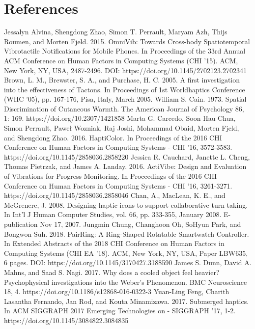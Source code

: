 \documentclass[preprint,12pt]{elsarticle}
\begin{document}
\section*{References}
\begin{thebibliography}{00}

Jessalyn Alvina, Shengdong Zhao, Simon T. Perrault, Maryam Azh, Thijs Roumen, and Morten Fjeld. 2015. OmniVib: Towards Cross-body Spatiotemporal Vibrotactile Notifications for Mobile Phones. In Proceedings of the 33rd Annual ACM Conference on Human Factors in Computing Systems (CHI '15). ACM, New York, NY, USA, 2487-2496. DOI: https://doi.org/10.1145/2702123.2702341
Brown, L. M., Brewster, S. A., and Purchase, H. C. 2005. A first investigation into the effectiveness of Tactons. In Proceedings of 1st Worldhaptics Conference (WHC '05), pp. 167-176, Pisa, Italy, March 2005.
William S. Cain. 1973. Spatial Discrimination of Cutaneous Warmth. The American Journal of Psychology 86, 1: 169. https://doi.org/10.2307/1421858
Marta G. Carcedo, Soon Hau Chua, Simon Perrault, Paweł Wozniak, Raj Joshi, Mohammad Obaid, Morten Fjeld, and Shengdong Zhao. 2016. HaptiColor. In Proceedings of the 2016 CHI Conference on Human Factors in Computing Systems - CHI '16, 3572-3583. https://doi.org/10.1145/2858036.2858220
Jessica R. Cauchard, Janette L. Cheng, Thomas Pietrzak, and James A. Landay. 2016. ActiVibe: Design and Evaluation of Vibrations for Progress Monitoring. In Proceedings of the 2016 CHI Conference on Human Factors in Computing Systems - CHI '16, 3261-3271. https://doi.org/10.1145/2858036.2858046
Chan, A., MacLean, K. E., and McGrenere, J. 2008. Designing haptic icons to support collaborative turn-taking. In Int'l J Human Computer Studies, vol. 66, pp. 333-355, January 2008. E-publication Nov 17, 2007.
Jungmin Chung, Changhoon Oh, SoHyun Park, and Bongwon Suh. 2018. PairRing: A Ring-Shaped Rotatable Smartwatch Controller. In Extended Abstracts of the 2018 CHI Conference on Human Factors in Computing Systems (CHI EA '18). ACM, New York, NY, USA, Paper LBW635, 6 pages. DOI: https://doi.org/10.1145/3170427.3188590
James S. Dunn, David A. Mahns, and Saad S. Nagi. 2017. Why does a cooled object feel heavier? Psychophysical investigations into the Weber's Phenomenon. BMC Neuroscience 18, 4. https://doi.org/10.1186/s12868-016-0322-3
Yuan-Ling Feng, Charith Lasantha Fernando, Jan Rod, and Kouta Minamizawa. 2017. Submerged haptics. In ACM SIGGRAPH 2017 Emerging Technologies on - SIGGRAPH '17, 1-2. https://doi.org/10.1145/3084822.3084835

\end{thebibliography}
\end{document}

